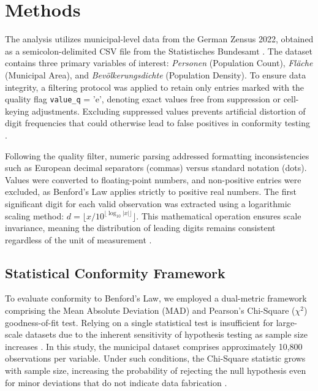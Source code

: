 \documentclass[11pt,a4paper]{article}
\begin{document}
\section{Methods}
The analysis utilizes municipal-level data from the German Zensus 2022, obtained as a semicolon-delimited CSV file from the Statistisches Bundesamt \cite{Schafer2005AutomatieIO}. The dataset contains three primary variables of interest: \textit{Personen} (Population Count), \textit{Fläche} (Municipal Area), and \textit{Bevölkerungsdichte} (Population Density). To ensure data integrity, a filtering protocol was applied to retain only entries marked with the quality flag \texttt{value\_q} = 'e', denoting exact values free from suppression or cell-keying adjustments. Excluding suppressed values prevents artificial distortion of digit frequencies that could otherwise lead to false positives in conformity testing \cite{Cole2019TestingTE}.

Following the quality filter, numeric parsing addressed formatting inconsistencies such as European decimal separators (commas) versus standard notation (dots). Values were converted to floating-point numbers, and non-positive entries were excluded, as Benford's Law applies strictly to positive real numbers. The first significant digit for each valid observation was extracted using a logarithmic scaling method: $d = \lfloor x / 10^{\lfloor \log_{10} |x| \rfloor} \rfloor$. This mathematical operation ensures scale invariance, meaning the distribution of leading digits remains consistent regardless of the unit of measurement \cite{Kossler2024SomeNI}.

\subsection{Statistical Conformity Framework}

To evaluate conformity to Benford's Law, we employed a dual-metric framework comprising the Mean Absolute Deviation (MAD) and Pearson's Chi-Square ($\chi^2$) goodness-of-fit test. Relying on a single statistical test is insufficient for large-scale datasets due to the inherent sensitivity of hypothesis testing as sample size increases \cite{Cole2019TestingTE}. In this study, the municipal dataset comprises approximately 10,800 observations per variable. Under such conditions, the Chi-Square statistic grows with sample size, increasing the probability of rejecting the null hypothesis even for minor deviations that do not indicate data fabrication \cite{Cole2019TestingTE}.
\end{document}
